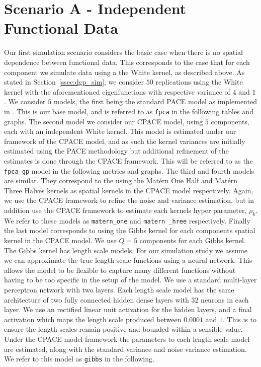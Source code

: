 \section{Scenario A - Independent Functional Data \label{sec:sim_A}}
Our first simulation scenario considers the basic case when there is no spatial dependence between functional data.
This corresponds to the case that for each component we simulate data using a the White kernel, as described above.
As stated in Section~\ref{ssec:dgp_sim}, we consider $50$ replications using the White kernel with the aforementioned eigenfunctions with respective variance of $4$ and $1$. 
We consider $5$ models, the first being the standard PACE model as implemented in \citep{yao_functional_2005}.
This is our base model, and is referred to as \verb*|fpca| in the following tables and graphs. 
The second model we consider our CPACE model, using $5$ components, each with an independent White kernel.
This model is estimated under our framework of the CPACE model, and as such the kernel variances are initially estimated using the PACE methodology but additional refinement of the estimates is done through the CPACE framework.
This will be referred to as the \verb*|fpca_gp| model in the following metrics and graphs.
The third and fourth models are similar.
They correspond to the using the Mat\'ern One Half and Mat\'ern Three Halves kernels as spatial kernels in the CPACE model respectively.
Again, we use the CPACE framework to refine the noise and variance estimation, but in addition use the CPACE framework to estimate each kernels hyper parameter, $\rho_k$.
We refer to these models as \verb*|matern_one| and \verb*|matern _hree| respectively.
Finally the last model corresponds to using the Gibbs kernel for each components spatial kernel in the CPACE model.
We use $Q=5$ components for each Gibbs kernel.
The Gibbs kernel has length scale models.
For our simulation study we assume we can approximate the true length scale functions using a neural network.
This allows the model to be flexible to capture many different functions without having to be too specific in the setup of the model.
We use a standard multi-layer perceptron network with two layers.
Each length scale model has the same architecture of two fully connected hidden dense layers with $32$ neurons in each layer.
We use an rectified linear unit activation for the hidden layers, and a final activation which maps the length scale produced between $0.0001$ and $1$.
This is to ensure the length scales remain positive and bounded within a sensible value.
Under the CPACE model framework the parameters to each length scale model are estimated, along with the standard variance and noise variance estimation.
We refer to this model as \verb*|gibbs| in the following.

